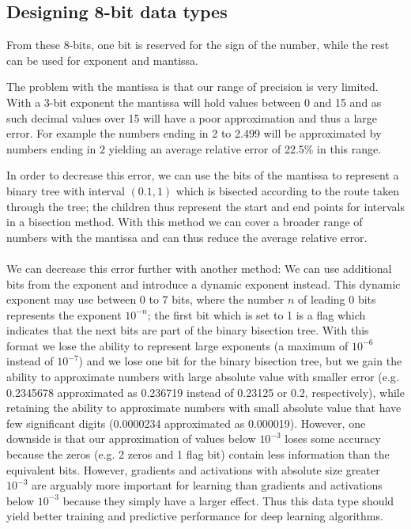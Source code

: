 \documentclass{article} %
\begin{document}
\subsection{Designing 8-bit data types}

From these 8-bits, one bit is reserved for the sign of the number, while the rest can be used for exponent and mantissa. 

The problem with the mantissa is that our range of precision is very limited. With a 3-bit exponent the mantissa will hold values between 0 and 15 and as such decimal values over 15 will have a poor approximation and thus a large error. For example the numbers ending in 2 to 2.499 will be approximated by numbers ending in $2$ yielding an average relative error of 22.5\% in this range.

In order to decrease this error, we can use the bits of the mantissa to represent a binary tree with interval $(0.1,1)$ which is bisected according to the route taken through the tree; the children thus represent the start and end points for intervals in a bisection method. With this method we can cover a broader range of numbers with the mantissa and can thus reduce the average relative error. \\\\
We can decrease this error further with another method: We can use additional bits from the exponent and introduce a dynamic exponent instead. This dynamic exponent may use between 0 to 7 bits, where the number $n$ of leading 0 bits represents the exponent $10^{-n}$; the first bit which is set to 1 is a flag which indicates that the next bits are part of the binary bisection tree. With this format we lose the ability to represent large exponents (a maximum of $10^{-6}$ instead of $10^{-7}$) and we lose one bit for the binary bisection tree, but we gain the ability to approximate numbers with large absolute value with smaller error (e.g. 0.2345678 approximated as 0.236719 instead of 0.23125 or 0.2, respectively), while retaining the ability to approximate numbers with small absolute value that have few significant digits (0.0000234 approximated as 0.000019). However, one downside is that our approximation of values below $10^{-3}$ loses some accuracy because the zeros (e.g. 2 zeros and 1 flag bit) contain less information than the equivalent bits. However, gradients and activations with absolute size greater $10^{-3}$ are arguably more important for learning than gradients and activations below $10^{-3}$ because they simply have a larger effect. Thus this data type should yield better training and predictive performance for deep learning algorithms. 
\end{document}
